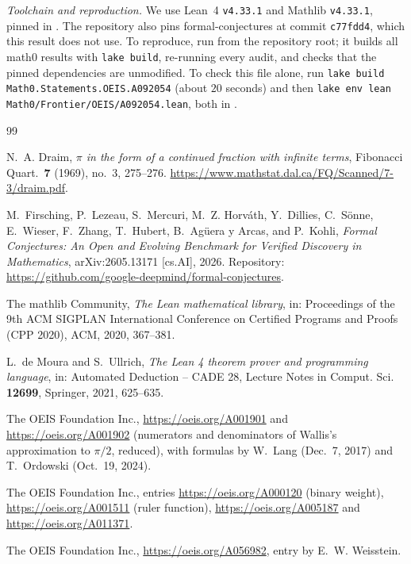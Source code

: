 \documentclass[11pt]{amsart}
\theoremstyle{plain}
\theoremstyle{definition}
\begin{document}
\emph{Toolchain and reproduction.} We use Lean~4 \cite{Lean4} \texttt{v4.33.1} and Mathlib \cite{Mathlib} \texttt{v4.33.1}, pinned in . The repository also pins formal-conjectures \cite{FC} at commit \texttt{c77fdd4}, which this result does not use. To reproduce, run  from the repository root; it builds all math0 results with \texttt{lake build}, re-running every audit, and checks that the pinned dependencies are unmodified. To check this file alone, run \texttt{lake build Math0.Statements.OEIS.A092054} (about $20$ seconds) and then \texttt{lake env lean Math0/Frontier/OEIS/A092054.lean}, both in .

\begin{thebibliography}{99}
\footnotesize\setlength{\itemsep}{0pt}

N.~A. Draim, \emph{$\pi$ in the form of a continued fraction with infinite terms}, Fibonacci Quart.\ \textbf{7} (1969), no.~3, 275--276. \url{https://www.mathstat.dal.ca/FQ/Scanned/7-3/draim.pdf}.

M.~Firsching, P.~Lezeau, S.~Mercuri, M.~Z. Horv\'ath, Y.~Dillies, C.~S\"onne, E.~Wieser, F.~Zhang, T.~Hubert, B.~Ag\"uera y Arcas, and P.~Kohli, \emph{Formal Conjectures: An Open and Evolving Benchmark for Verified Discovery in Mathematics}, arXiv:2605.13171 [cs.AI], 2026. Repository: \url{https://github.com/google-deepmind/formal-conjectures}.

The mathlib Community, \emph{The Lean mathematical library}, in: Proceedings of the 9th ACM SIGPLAN International Conference on Certified Programs and Proofs (CPP 2020), ACM, 2020, 367--381.

L.~de Moura and S.~Ullrich, \emph{The Lean 4 theorem prover and programming language}, in: Automated Deduction -- CADE 28, Lecture Notes in Comput. Sci. \textbf{12699}, Springer, 2021, 625--635.

The OEIS Foundation Inc., \url{https://oeis.org/A001901} and \url{https://oeis.org/A001902} (numerators and denominators of Wallis's approximation to $\pi/2$, reduced), with formulas by W.~Lang (Dec.~7, 2017) and T.~Ordowski (Oct.~19, 2024).

The OEIS Foundation Inc., entries \url{https://oeis.org/A000120} (binary weight), \url{https://oeis.org/A001511} (ruler function), \url{https://oeis.org/A005187} and \url{https://oeis.org/A011371}.

The OEIS Foundation Inc., \url{https://oeis.org/A056982}, entry by E.~W. Weisstein.


\end{thebibliography}
\end{document}
